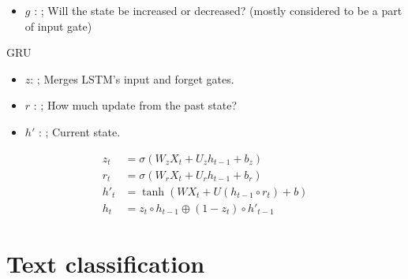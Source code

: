 \documentclass{KBook}
\begin{document}
	\begin{itemize}
		\item $g$ : ;
		Will the state be  increased or decreased?
		(mostly considered to be a part of input gate)
		
	\end{itemize}
	
GRU
	
	\begin{minipage}{0.50\textwidth} 
		\begin{itemize}
			\item $z$: ;
			Merges LSTM's input and forget gates. 
			\item $r$ : ; 
			How much update from the past state?
			\item $h'$ : ;
			Current state.	
		\end{itemize}
		{\small
			\begin{align*}
				z_t &= \sigma(W_z X_t + U_z h_{t-1} + b_z) \\
				r_t &= \sigma(W_r X_t + U_r h_{t-1} + b_r) \\
				h'_t &= \tanh(W X_t + U (h_{t-1} \circ r_t) + b) \\
				h_t &= z_t \circ h_{t-1} \oplus (1-z_t) \circ h'_{t-1}
			\end{align*}
		}
	\end{minipage}
	\begin{minipage}{0.49\textwidth}
	\end{minipage}
	


\section{Text classification}
\end{document}
